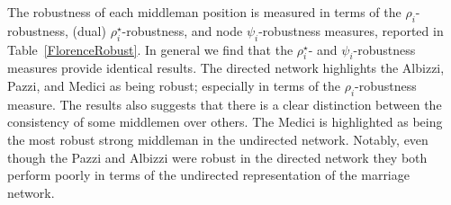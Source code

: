
The robustness of each middleman position is measured in terms of the $\rho_{i}$-robustness, (dual) $\rho^{\star}_{i}$-robustness, and node $\psi_{i}$-robustness measures, reported in Table~\ref{FlorenceRobust}. In general we find that the $\rho^{\star}_{i}$- and $\psi_{i}$-robustness measures provide identical results. The directed network highlights the Albizzi, Pazzi, and Medici as being robust; especially in terms of the $\rho_{i}$-robustness measure. The results also suggests that there is a clear distinction between the consistency of some middlemen over others. The Medici is highlighted as being the most robust strong middleman in the undirected network. Notably, even though the Pazzi and Albizzi were robust in the directed network they both perform poorly in terms of the undirected representation of the marriage network.

